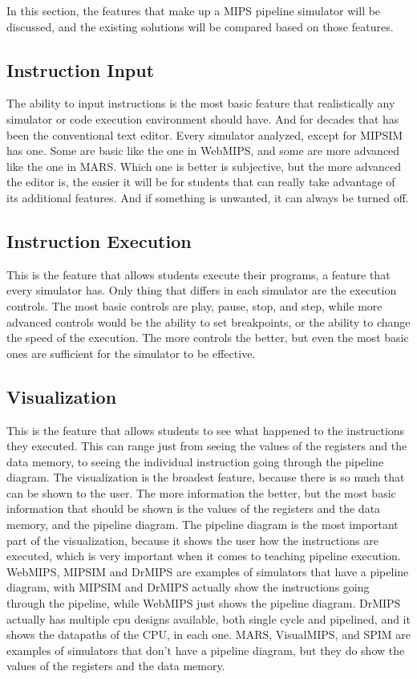 In this section, the features that make up a MIPS pipeline simulator will be discussed, and the existing solutions will be compared based on those features.

\subsection{Instruction Input}\label{sec:instruction_input}
The ability to input instructions is the most basic feature that realistically any simulator or code execution environment should have. And for decades that has been the conventional text editor. Every simulator analyzed, except for MIPSIM has one. Some are basic like the one in WebMIPS, and some are more advanced like the one in MARS. Which one is better is subjective, but the more advanced the editor is, the easier it will be for students that can really take advantage of its additional features. And if something is unwanted, it can always be turned off.

\subsection{Instruction Execution}\label{sec:instruction_execution}
This is the feature that allows students execute their programs, a feature that every simulator has. Only thing that differs in each simulator are the execution controls. The most basic controls are play, pause, stop, and step, while more advanced controls would be the ability to set breakpoints, or the ability to change the speed of the execution. The more controls the better, but even the most basic ones are sufficient for the simulator to be effective.

\subsection{Visualization}\label{sec:instruction_visualization}
This is the feature that allows students to see what happened to the instructions they executed. This can range just from seeing the values of the registers and the data memory, to seeing the individual instruction going through the pipeline diagram. The visualization is the broadest feature, because there is so much that can be shown to the user. The more information the better, but the most basic information that should be shown is the values of the registers and the data memory, and the pipeline diagram. The pipeline diagram is the most important part of the visualization, because it shows the user how the instructions are executed, which is very important when it comes to teaching pipeline execution. WebMIPS, MIPSIM and DrMIPS are examples of simulators that have a pipeline diagram, with MIPSIM and DrMIPS actually show the instructions going through the pipeline, while WebMIPS just shows the pipeline diagram. DrMIPS actually has multiple cpu designs available, both single cycle and pipelined, and it shows the datapaths of the CPU, in each one. MARS, VisualMIPS, and SPIM are examples of simulators that don't have a pipeline diagram, but they do show the values of the registers and the data memory.


